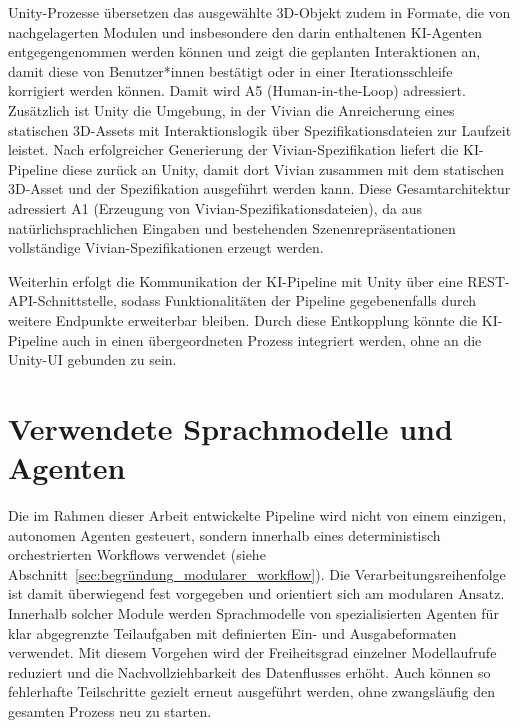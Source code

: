 Unity-Prozesse übersetzen das ausgewählte 3D-Objekt zudem in Formate, die von nachgelagerten Modulen und insbesondere den darin enthaltenen KI-Agenten entgegengenommen werden können und zeigt die geplanten Interaktionen an, damit diese von Benutzer*innen bestätigt oder in einer Iterationsschleife korrigiert werden können. Damit wird A5 (Human-in-the-Loop) adressiert.
Zusätzlich ist Unity die Umgebung, in der Vivian die Anreicherung eines statischen 3D-Assets mit Interaktionslogik über Spezifikationsdateien zur Laufzeit leistet.
Nach erfolgreicher Generierung der Vivian-Spezifikation liefert die KI-Pipeline diese zurück an Unity, damit dort Vivian zusammen mit dem statischen 3D-Asset und der Spezifikation ausgeführt werden kann.
Diese Gesamtarchitektur adressiert A1 (Erzeugung von Vivian-Spezifikationsdateien), da aus natürlichsprachlichen Eingaben und bestehenden Szenenrepräsentationen vollständige Vivian-Spezifikationen erzeugt werden.

Weiterhin erfolgt die Kommunikation der KI-Pipeline mit Unity über eine REST-API-Schnittstelle, sodass Funktionalitäten der Pipeline gegebenenfalls durch weitere Endpunkte erweiterbar bleiben.
Durch diese Entkopplung könnte die KI-Pipeline auch in einen übergeordneten Prozess integriert werden, ohne an die Unity-UI gebunden zu sein.

\section{Verwendete Sprachmodelle und Agenten}

Die im Rahmen dieser Arbeit entwickelte Pipeline wird nicht von einem einzigen, autonomen Agenten gesteuert, sondern innerhalb eines deterministisch orchestrierten Workflows verwendet (siehe Abschnitt~\ref{sec:begründung_modularer_workflow}). Die Verarbeitungsreihenfolge ist damit überwiegend fest vorgegeben und orientiert sich am modularen Ansatz. Innerhalb solcher Module werden Sprachmodelle von spezialisierten Agenten für klar abgegrenzte Teilaufgaben mit definierten Ein- und Ausgabeformaten verwendet. Mit diesem Vorgehen wird der Freiheitsgrad einzelner Modellaufrufe reduziert und die Nachvollziehbarkeit des Datenflusses erhöht. Auch können so fehlerhafte Teilschritte gezielt erneut ausgeführt werden, ohne zwangsläufig den gesamten Prozess neu zu starten.


